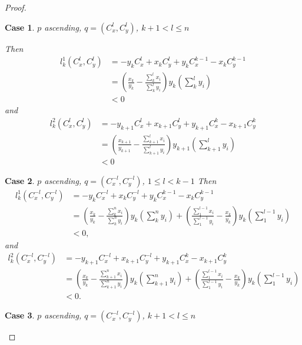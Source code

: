 \documentclass{article}
\theoremstyle{case}
\newtheorem{case}{Case}
\begin{document}
\begin{proof}
%
%
\begin{case} $p$ ascending, $q = \left( C_x^l, C_y^l\right)$, $k+1 < l \leq n$

\noindent Then
\begin{align*}
l_k^1\left( C_x^l, C_y^l\right) &= -y_kC_x^l + x_kC_y^l + y_kC_x^{k-1} - x_kC_y^{k-1} \\
&= \left( \frac{x_k}{y_k} - \frac{\sum_k^l x_i}{\sum_k^l y_i}\right)y_k\left( \sum_k^l y_i\right) \\
&< 0
\end{align*}
and
\begin{align*}
l_k^2\left(C_x^l, C_y^l\right) &= -y_{k+1}C_x^l + x_{k+1}C_y^l + y_{k+1}C_x^k - x_{k+1}C_y^k \\
&= \left( \frac{x_{k+1}}{y_{k+1}} - \frac{\sum_{k+1}^l x_i}{\sum_{k+1}^l y_i}\right)y_{k+1}\left( \sum_{k+1}^l y_i\right) \\
&< 0
\end{align*}
\end{case}

%
%
\begin{case} $p$ ascending, $q = \left( C_x^{-l}, C_y^{-l}\right)$, $1 \leq l < k-1$
\noindent Then 
\begin{align*}
l_k^1\left( C_x^{-l}, C_y^{-l}\right) &= -y_kC_x^{-l} + x_kC_{y}^{-l} + y_kC_x^{k-1} - x_kC_y^{k-1} \\
&=\left( \frac{x_k}{y_k} - \frac{\sum_k^nx_i}{\sum_k^ny_i}\right)y_k\left(\sum_k^n y_i\right)  + \left( \frac{\sum_1^{l-1}x_i}{\sum_1^{l-1}y_i} - \frac{x_k}{y_k}\right)y_k\left(\sum_1^{l-1}y_i\right) \\
&< 0,
\end{align*}
and
\begin{align*}
l_k^2\left( C_x^{-l}, C_y^{-l}\right) &= -y_{k+1}C_x^{-l} + x_{k+1}C_y^{-l} + y_{k+1}C_x^k - x_{k+1}C_y^k \\
&= \left( \frac{x_k}{y_k} - \frac{\sum_{k+1}^nx_i}{\sum_{k+1}^ny_i}\right)y_k\left( \sum_{k+1}^n y_i\right) + \left( \frac{\sum_1^{l-1}x_i}{\sum_1^{l-1}y_i} - \frac{x_k}{y_k}\right)y_k\left( \sum_1^{l-1}y_i\right) \\
&< 0.
\end{align*}
\end{case}

%
%
\begin{case} $p$ ascending, $q = \left( C_x^{-l}, C_y^{-l}\right)$, $k+1 < l \leq n$


\end{case}
\end{proof}
\end{document}
